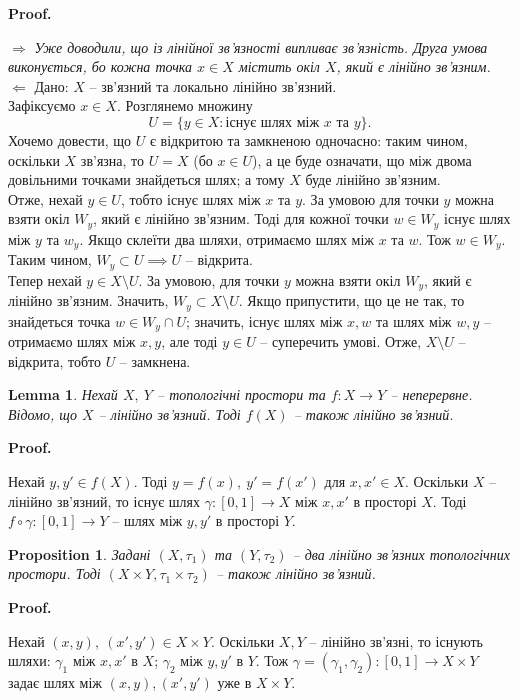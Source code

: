 \documentclass[a4paper, 10pt]{article}
\makeatletter
\def\rightproof{$\boxed{\Rightarrow}$ }
\def\leftproof{$\boxed{\Leftarrow}$ }
\theoremstyle{theoremdd}
\newtheorem{proposition}[theorem]{Proposition}
\newtheorem{lemma}[theorem]{Lemma}
\renewenvironment{proof}[1][Proof.\\]{\par
\pushQED{\hfill \qed}%
\normalfont \topsep6\p@\@plus6\p@\relax
\trivlist
\item\relax
{\bfseries
#1\@addpunct{.}}\hspace\labelsep\ignorespaces
}{%
\popQED\endtrivlist\@endpefalse
}
\makeatother
\begin{document}
\begin{proof}
\rightproof \textit{Уже доводили, що із лінійної зв'язності випливає зв'язність. Друга умова виконується, бо кожна точка $x \in X$ містить окіл $X$, який є лінійно зв'язним.}
\bigskip \\
\leftproof Дано: $X$ -- зв'язний та локально лінійно зв'язний.\\
Зафіксуємо $x \in X$. Розглянемо множину 
\[
U = \{y \in X: \text{існує шлях між $x$ та $y$}\}.
\]
Хочемо довести, що $U$ є відкритою та замкненою одночасно: таким чином, оскільки $X$ зв'язна, то $U = X$ (бо $x \in U$), а це буде означати, що між двома довільними точками знайдеться шлях; а тому $X$ буде лінійно зв'язним.\\
Отже, нехай $y \in U$, тобто існує шлях між $x$ та $y$. За умовою для точки $y$ можна взяти окіл $W_y$, який є лінійно зв'язним. Тоді для кожної точки $w \in W_y$ існує шлях між $y$ та $w_y$. Якщо склеїти два шляхи, отримаємо шлях між $x$ та $w$. Тож $w \in W_y$. Таким чином, $W_y \subset U \implies U$ -- відкрита.\\
Тепер нехай $y \in X \setminus U$. За умовою, для точки $y$ можна взяти окіл $W_y$, який є лінійно зв'язним. Значить, $W_y \subset X \setminus U$. Якщо припустити, що це не так, то знайдеться точка $w \in W_y \cap U$; значить, існує шлях між $x,w$ та шлях між $w,y$ -- отримаємо шлях між $x,y$, але тоді $y \in U$ -- суперечить умові. Отже, $X \setminus U$ -- відкрита, тобто $U$ -- замкнена.
\end{proof}

\begin{lemma}
Нехай $X,\ Y$ -- топологічні простори та $f \colon X \to Y$ -- неперервне. Відомо, що $X$ -- лінійно зв'язний. Тоді $f(X)$ -- також лінійно зв'язний.
\end{lemma}

\begin{proof}
Нехай $y,y' \in f(X)$. Тоді $y = f(x),\ y' = f(x')$ для $x,x' \in X$. Оскільки $X$ -- лінійно зв'язний, то існує шлях $\gamma \colon [0,1] \to X$ між $x,x'$ в просторі $X$. Тоді $f \circ\gamma \colon [0,1] \to Y$ -- шлях між $y,y'$ в просторі $Y$.
\end{proof}

\begin{proposition}
Задані $(X,\tau_1)$ та $(Y,\tau_2)$ -- два лінійно зв'язних топологічних простори. Тоді $(X \times Y, \tau_1 \times \tau_2)$ -- також лінійно зв'язний.
\end{proposition}

\begin{proof}
Нехай $(x,y),\ (x',y') \in X \times Y$. Оскільки $X,Y$ -- лінійно зв'язні, то існують шляхи: $\gamma_1$ між $x,x'$ в $X$; $\gamma_2$ між $y,y'$ в $Y$. Тож $\gamma = (\gamma_1, \gamma_2) \colon [0,1] \to X \times Y$ задає шлях між $(x,y), (x',y')$ уже в $X \times Y$.
\end{proof}
\end{document}
